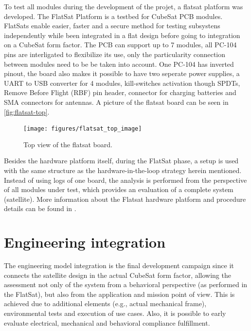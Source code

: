 To test all modules during the development of the projet, a flatsat platform was developed. The FlatSat Platform is a testbed for CubeSat PCB modules. FlatSats enable easier, faster and a secure method for testing subsystens independently while been integrated in a flat design before going to integration on a CubeSat form factor. The PCB can support up to 7 modules, all PC-104 pins are interligated to flexibilize its use, only the particularity connection between modules need to be be taken into account. One PC-104 has inverted pinout, the board also makes it possible to have two seperate power supplies, a UART to USB converter for 4 modules, kill-switches activation though SPDTs, Remove Before Flight (RBF) pin header, connector for charging batteries and SMA connectors for antennas. A picture of the flatsat board can be seen in \autoref{fig:flatsat-top}.

\begin{figure}[!ht]
    \begin{center}
        \texttt{[image: figures/flatsat\_top\_image]}
        \caption{Top view of the flatsat board.}
        \label{fig:flatsat-top}
    \end{center}
\end{figure}

Besides the hardware platform itself, during the FlatSat phase, a setup is used with the same structure as the hardware-in-the-loop strategy herein mentioned. Instead of using logs of one board, the analysis is performed from the perspective of all modules under test, which provides an evaluation of a complete system (satellite). More information about the Flatsat hardware platform and procedure details can be found in \cite{flatsat}.


\section{Engineering integration}

The engineering model integration is the final development campaign since it connects the satellite design in the actual CubeSat form factor, allowing the assessment not only of the system from a behavioral perspective (as performed in the FlatSat), but also from the application and mission point of view. This is achieved due to additional elements (e.g., actual mechanical frame), environmental tests and execution of use cases. Also, it is possible to early evaluate electrical, mechanical and behavioral compliance fulfillment.

